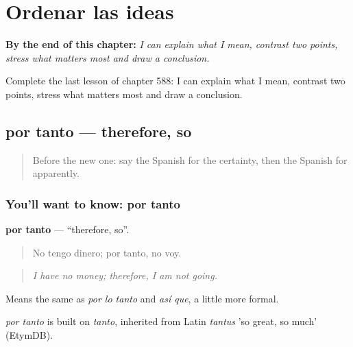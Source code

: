 
\chapter{Ordenar las ideas}
\label{ch:es-ordenar-las-ideas}

\begin{chapteropening}
\textbf{By the end of this chapter:} \emph{I can explain what I mean, contrast two points, stress what matters most and draw a conclusion.}

Complete the last lesson of chapter 588: I can explain what I mean, contrast two points, stress what matters most and draw a conclusion.
\end{chapteropening}

\section[por tanto]{por tanto — therefore, so}

\label{lesson:ES-C588-por-tanto}



\begin{quote}
Before the new one: say the Spanish for the certainty, then the Spanish for apparently.
\end{quote}

\subsection*{You'll want to know: por tanto}
\textbf{por tanto} — \textquotedblleft{}therefore, so\textquotedblright{}.

\begin{quote}
No tengo dinero; por tanto, no voy.
\end{quote}

\begin{quote}
\emph{I have no money; therefore, I am not going.}
\end{quote}

Means the same as \emph{por lo tanto} and \emph{así que}, a little more formal.

\begin{cousinweb}
\emph{por tanto} is built on \emph{tanto}, inherited from Latin \emph{tantus} 'so great, so much' (EtymDB).
\end{cousinweb}


